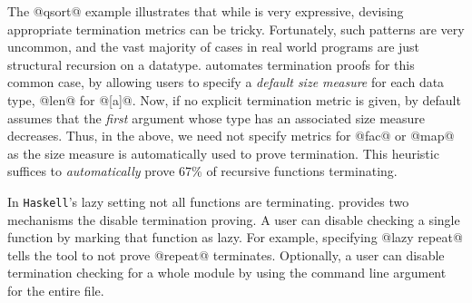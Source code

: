 

%
The @qsort@ example illustrates that while \toolname is 
very expressive, devising appropriate termination metrics 
can be tricky.
%
Fortunately, such patterns are very uncommon, and the vast
majority of cases in real world programs are just structural 
recursion on a datatype.
%
\toolname automates termination proofs for this common case,
by allowing users to specify a \emph{default size measure} 
for each data type, \eg @len@ for @[a]@.
%
Now, if no explicit termination metric is given, by default 
\toolname assumes that the \emph{first} argument whose type
has an associated size measure decreases.
%
Thus, in the above, we need not specify metrics for @fac@ 
or @map@ as the size measure is automatically 
used to prove termination. 
%
This heuristic suffices to \emph{automatically}
prove 67\% of recursive functions terminating.

In \texttt{Haskell}'s lazy setting not all functions are terminating.
% 
\toolname provides two mechanisms the disable termination proving.
%
A user can disable checking a single function by marking 
that function as lazy. For example, specifying @lazy repeat@ 
tells the tool to not prove @repeat@ terminates.
%
Optionally, a user can disable termination checking for a whole
module by using the command line argument \cmdnotermination
for the entire file.
